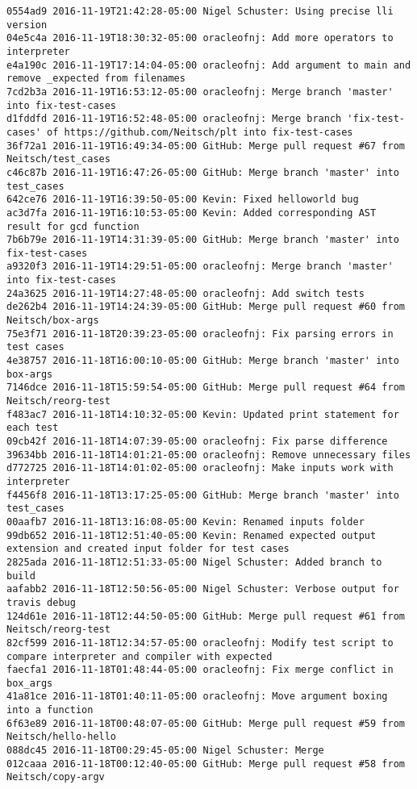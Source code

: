 \begin{lstlisting}
0554ad9 2016-11-19T21:42:28-05:00 Nigel Schuster: Using precise lli version
04e5c4a 2016-11-19T18:30:32-05:00 oracleofnj: Add more operators to interpreter
e4a190c 2016-11-19T17:14:04-05:00 oracleofnj: Add argument to main and remove _expected from filenames
7cd2b3a 2016-11-19T16:53:12-05:00 oracleofnj: Merge branch 'master' into fix-test-cases
d1fddfd 2016-11-19T16:52:48-05:00 oracleofnj: Merge branch 'fix-test-cases' of https://github.com/Neitsch/plt into fix-test-cases
36f72a1 2016-11-19T16:49:34-05:00 GitHub: Merge pull request #67 from Neitsch/test_cases
c46c87b 2016-11-19T16:47:26-05:00 GitHub: Merge branch 'master' into test_cases
642ce76 2016-11-19T16:39:50-05:00 Kevin: Fixed helloworld bug
ac3d7fa 2016-11-19T16:10:53-05:00 Kevin: Added corresponding AST result for gcd function
7b6b79e 2016-11-19T14:31:39-05:00 GitHub: Merge branch 'master' into fix-test-cases
a9320f3 2016-11-19T14:29:51-05:00 oracleofnj: Merge branch 'master' into fix-test-cases
24a3625 2016-11-19T14:27:48-05:00 oracleofnj: Add switch tests
de262b4 2016-11-19T14:24:39-05:00 GitHub: Merge pull request #60 from Neitsch/box-args
75e3f71 2016-11-18T20:39:23-05:00 oracleofnj: Fix parsing errors in test cases
4e38757 2016-11-18T16:00:10-05:00 GitHub: Merge branch 'master' into box-args
7146dce 2016-11-18T15:59:54-05:00 GitHub: Merge pull request #64 from Neitsch/reorg-test
f483ac7 2016-11-18T14:10:32-05:00 Kevin: Updated print statement for each test
09cb42f 2016-11-18T14:07:39-05:00 oracleofnj: Fix parse difference
39634bb 2016-11-18T14:01:21-05:00 oracleofnj: Remove unnecessary files
d772725 2016-11-18T14:01:02-05:00 oracleofnj: Make inputs work with interpreter
f4456f8 2016-11-18T13:17:25-05:00 GitHub: Merge branch 'master' into test_cases
00aafb7 2016-11-18T13:16:08-05:00 Kevin: Renamed inputs folder
99db652 2016-11-18T12:51:40-05:00 Kevin: Renamed expected output extension and created input folder for test cases
2825ada 2016-11-18T12:51:33-05:00 Nigel Schuster: Added branch to build
aafabb2 2016-11-18T12:50:56-05:00 Nigel Schuster: Verbose output for travis debug
124d61e 2016-11-18T12:44:50-05:00 GitHub: Merge pull request #61 from Neitsch/reorg-test
82cf599 2016-11-18T12:34:57-05:00 oracleofnj: Modify test script to compare interpreter and compiler with expected
faecfa1 2016-11-18T01:48:44-05:00 oracleofnj: Fix merge conflict in box_args
41a81ce 2016-11-18T01:40:11-05:00 oracleofnj: Move argument boxing into a function
6f63e89 2016-11-18T00:48:07-05:00 GitHub: Merge pull request #59 from Neitsch/hello-hello
088dc45 2016-11-18T00:29:45-05:00 Nigel Schuster: Merge
012caaa 2016-11-18T00:12:40-05:00 GitHub: Merge pull request #58 from Neitsch/copy-argv

\end{lstlisting}

